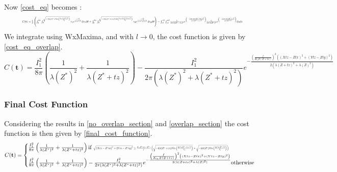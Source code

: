 \begin{itemize}
\end{itemize}
Now \eqref{cost_eq} becomes :
\begin{equation}
    \resizebox{.9\hsize}{!}{$C(\textbf{t})=\frac{1}{2}\left(\int_{0}^{2\pi}\int_{0}^{\sqrt{-2\lambda(Z^{*})^{2} ln\left( \frac{2\pi\lambda(Z^{*})^{2}}{I_{1}}\right)}} r_{1} e^{\frac{-r_{1}^{2}}{\lambda(Z^{*})^{2}}} dr_{1}d\theta + \int_{0}^{2\pi}\int_{0}^{\sqrt{-2\lambda(Z^{*}+tz)^{2} ln\left( \frac{2\pi\lambda(Z^{*}+tz)^{2}}{I_{1}}\right)}} r_{2} e^{\frac{-r_{2}^{2}}{\lambda(Z^{*}+tz)^{2}}} dr_{2}d\theta \right) - \int_{v1}^{v2}\int_{u1}^{u2}  \frac{I_{1}}{2\pi\lambda(Z^{*}+tz)^{2}} e^{\left(-\frac{||\textbf{u}-pr(\textbf{X}^{*}+\textbf{t})||^{2}}{2\lambda(Z^{*}+tz)^{2}}\right)} \frac{I_{1}}{2\pi\lambda(Z^{*})^{2}} e^{\left(-\frac{||\textbf{u}-pr(\textbf{X}^{*})||^{2}}{2\lambda(Z^{*})^{2}}\right)}  du dv$}
    \label{int_u1,v1}
\end{equation}
We integrate using WxMaxima, and with $l\rightarrow 0$, the cost function is given by \eqref{cost_eq_overlap}.
\begin{equation}
    C(\textbf{t})=\frac{I_{1}^{2}}{8\pi}\left(\frac{1}{\lambda(Z^{*})^{2}}+\frac{1}{\lambda(Z^{*}+tz)^{2}}\right) -\frac{I_{1}^{2}}{2\pi(\lambda(Z^{*})^{2}+\lambda(Z^{*}+tz)^2)}e^{-\frac{\left(\frac{f}{K_{u}Z(Z+tz)}\right)^{2}\left((Xtz-Ztx)^{2}+(Ytz-Zty)^{2}\right)}{2(\lambda(Z+tz)^{2}+\lambda(Z)^{2})}}
    \label{cost_eq_overlap}
\end{equation}
\subsubsection{Final Cost Function}
Considering the results in \ref{no_overlap_section} and \ref{overlap_section} the cost function is then given by \eqref{final_cost_function}.
\begin{equation}
    C(\textbf{t}) = 
    \begin{cases}
        \frac{I_{1}^{2}}{8\pi}\left(\frac{1}{\lambda(Z^{*})^{2}}+\frac{1}{\lambda(Z^{*}+tz)^{2}}\right) \text{if } \resizebox{.7\hsize}{!}{$\sqrt{\left(Xtz-Z^{*}tx\right)^{2}+\left(Ytz-Z^{*}ty\right)^{2}} \geq \frac{K_{u}Z^{*}\left(tz+Z^{*}\right)}{f} \left(\sqrt{-2\lambda(Z^{*}+tz)^{2} ln\left( \frac{2\pi\lambda(Z^{*}+tz)^{2}l}{I_{1}}\right)}+ \sqrt{-2\lambda(Z^{*})^{2} ln\left( \frac{2\pi\lambda(Z^{*})^{2}l}{I_{1}}\right)} \right)$} & \\
        \frac{I_{1}^{2}}{8\pi}\left(\frac{1}{\lambda(Z^{*})^{2}}+\frac{1}{\lambda(Z^{*}+tz)^{2}}\right) -\frac{I_{1}^{2}}{2\pi(\lambda(Z^{*})^{2}+\lambda(Z^{*}+tz)^2)}e^{-\frac{\left(\frac{f}{K_{u}Z(Z+tz)}\right)^{2}\left((Xtz-Ztx)^{2}+(Ytz-Zty)^{2}\right)}{2(\lambda(Z+tz)^{2}+\lambda(Z)^{2})}} \text{otherwise} & 
    \end{cases}
    \label{final_cost_function}
\end{equation}


